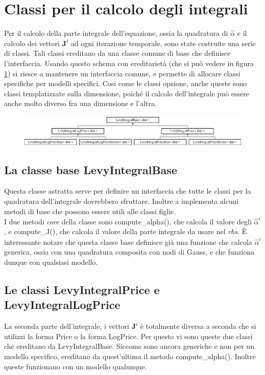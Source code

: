 \documentclass[a4paper,10pt]{report}
\theoremstyle{plain}
\theoremstyle{definition}
\theoremstyle{remark}
\begin{document}
\section{Classi per il calcolo degli integrali}
Per il calcolo della parte integrale dell'equazione, ossia la quadratura di $\hat{\alpha}$ e il calcolo dei vettori $\mathbf{J}^i$ ad ogni iterazione temporale, sono state costruite una serie di classi. Tali classi ereditano da una classe comune di base che definisce l'interfaccia. Usando questo schema con ereditarietà (che si può vedere in figura \ref{fig:levybase}) si riesce a mantenere un interfaccia comune, e permette di allocare classi specifiche per modelli specifici. Cosi come le classi opzione, anche queste sono classi templatizzate sulla dimensione, poiché il calcolo dell'integrale può essere anche molto diverso fra una dimensione e l'altra.
\begin{figure}[h!]
\begin{center}
\includegraphics[width=12cm]{img/classLevyIntegralBase.eps}
\label{fig:levybase}
\end{center}
\end{figure}
\subsection{La classe base \textsf{LevyIntegralBase}}
Questa classe astratta serve per definire un interfaccia che tutte le classi per la quadratura dell'integrale dovrebbero sfruttare. Inoltre a implementa alcuni metodi di base che possono essere utili alle classi figlie.\\
I due metodi \emph{core} della classe sono \textsf{compute\_alpha()}, che calcola il valore degli $\hat{\alpha}^i$, e \textsf{compute\_J()}, che calcola il valore della parte integrale da usare nel \emph{rhs}. È interessante notare che questa classe base definisce già una funzione che calcola $\hat{\alpha}^i$ generica, ossia con una quadratura composita con nodi di Gauss, e che funziona dunque con qualsiasi modello.

\subsection{Le classi \textsf{LevyIntegralPrice} e \textsf{LevyIntegralLogPrice}}
La seconda parte dell'integrale, i vettori $\mathbf{J}^i$ è totalmente diversa a seconda che si utilizzi la forma Price o la forma LogPrice. Per questo vi sono queste due classi che ereditano da \textsf{LevyIntegralBase}. Siccome sono ancora generiche e non per un modello specifico, ereditano da quest'ultima il metodo \textsf{compute\_alpha()}. Inoltre queste funzionano con un modello qualunque.
\end{document}
